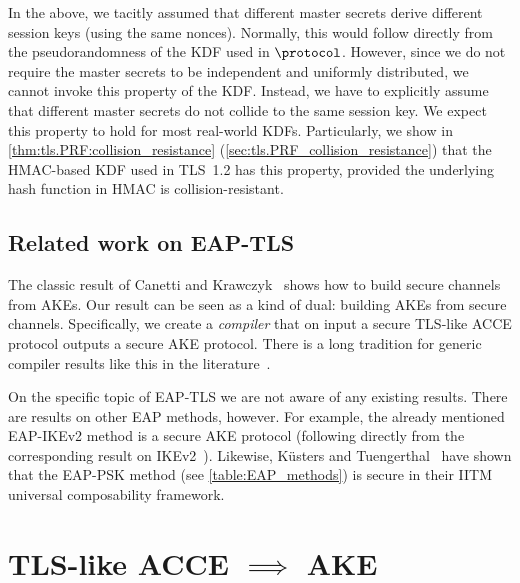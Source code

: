 In the above, we tacitly assumed that different master secrets derive different session keys 
(using the same nonces).
Normally,
this would follow directly from the pseudorandomness of the KDF used in $\protocol$.
However,
since we do not require the master secrets to be independent and uniformly distributed,
we cannot invoke this property of the KDF.
Instead, 
we have to explicitly assume that different master secrets do not collide to the same session key.
We expect this property to hold for most real-world KDFs.
Particularly,
we show in \cref{thm:tls.PRF:collision_resistance} (\cref{sec:tls.PRF_collision_resistance})
that the HMAC-based KDF used in TLS~1.2 has this property,
provided the underlying hash function in HMAC is collision-resistant.
 








\subsection{Related work on EAP-TLS}

The classic result of Canetti and Krawczyk~\cite{EC:CanKra01} shows how to build secure channels from AKEs.
Our result can be seen as a kind of dual: building AKEs from secure channels.
Specifically,
we create a \emph{compiler} that on input a secure TLS-like ACCE protocol outputs a secure AKE protocol.
There is a long tradition for generic compiler results like this in the literature~\cite{STOC:BelCanKra98,C:KatYun03,AC:JKSS10,IMA:BoyGon11,ESORICS:CreFel12,CCS:Krawczyk16}.

On the specific topic of EAP-TLS we are not aware of any existing results.
There are results on other EAP methods, however.
For example, the already mentioned EAP-IKEv2 method is a secure AKE protocol
(following directly from the corresponding result on IKEv2~\cite{C:CanKra02}).
Likewise,
Küsters and Tuengerthal~\cite{CCS:KusTue11} have shown that the EAP-PSK method (see \cref{table:EAP_methods}) is 
secure 
in their IITM universal composability framework.


\section{TLS-like ACCE \texorpdfstring{$\implies$}{->} AKE}\label{sec:EAP-TLS-security:technical_result}

